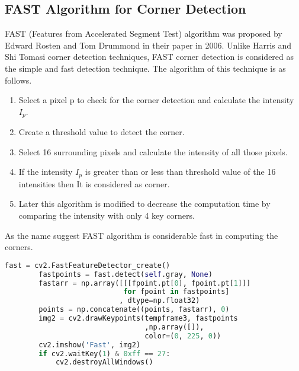\subsection{FAST Algorithm for Corner Detection}
FAST (Features from Accelerated Segment Test) algorithm was proposed by Edward Rosten and Tom Drummond in their paper \cite{rosten2006machine} in 2006. Unlike Harris and Shi Tomasi corner detection techniques, FAST corner detection is considered as the simple and fast detection technique. The algorithm of this technique is as follows.
\begin{enumerate}
	\item Select a pixel p to check for the corner detection and calculate the intensity $I_{p}$.
	\item Create a threshold value to detect the corner.
	\item Select 16 surrounding pixels and calculate the intensity of all those pixels.
	\item If the intensity $I_{p}$ is greater than or less than threshold value of the 16 intensities then It is considered as corner.
	\item Later this algorithm is modified to decrease the computation time by comparing the intensity with only 4 key corners.
\end{enumerate}
As the name suggest FAST algorithm is considerable fast in computing the corners.

\begin{lstlisting}[language=Python, frame=single, caption=Python Code to compute FAST Corner detection]
        fast = cv2.FastFeatureDetector_create()
        fastpoints = fast.detect(self.gray, None)
        fastarr = np.array([[[fpoint.pt[0], fpoint.pt[1]]]
                            for fpoint in fastpoints]
                           , dtype=np.float32)
        points = np.concatenate((points, fastarr), 0)
        img2 = cv2.drawKeypoints(tempframe3, fastpoints
                                 ,np.array([]),
                                 color=(0, 225, 0))
        cv2.imshow('Fast', img2)
        if cv2.waitKey(1) & 0xff == 27:
            cv2.destroyAllWindows()
\end{lstlisting}

